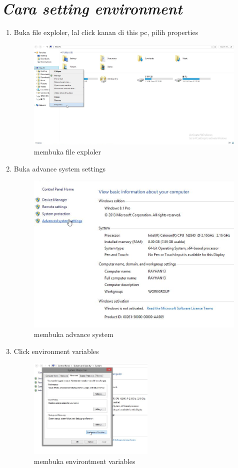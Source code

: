 \section*{\textit{ Cara setting environment }}
\begin{enumerate}

\item Buka file exploler, lal click kanan di this pc, pilih properties
\begin{figure}[h]
\centering
\includegraphics[scale=0.8]{figure/setting1.png}
\caption{membuka file exploler}
\end{figure}

\item Buka advance system settings
\begin{figure}[hb]
\centering
\includegraphics[scale=0.8]{figure/setting2.png}
\caption{membuka advance system}
\end{figure}

\item Click environment variables
\begin{figure}[hb]
\includegraphics[width=6cm]{figure/setting3.png}
\centering
\caption{membuka environtment variables}
\end{figure}


\end{enumerate}
